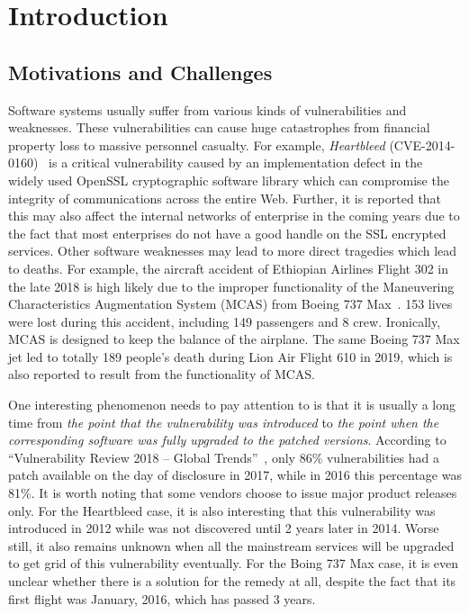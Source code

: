 
\chapter{Introduction} \label{ch:introduction}


\section{Motivations and Challenges}
Software systems usually suffer from various kinds of vulnerabilities and weaknesses. These vulnerabilities can cause huge catastrophes from financial property loss to massive personnel casualty. For example, \emph{Heartbleed} (CVE-2014-0160)~\cite{heartbleed} is a critical vulnerability caused by an implementation defect in the widely used OpenSSL cryptographic software library which can compromise the integrity of communications across the entire Web. Further, it is reported that this may also affect the internal networks of enterprise in the coming years due to the fact that most enterprises do not have a good handle on the SSL encrypted services. Other software weaknesses may lead to more direct tragedies which lead to deaths. For example, the aircraft accident of Ethiopian Airlines Flight 302 in the late 2018 is high likely due to the improper functionality of the Maneuvering Characteristics Augmentation System (MCAS) from Boeing 737 Max~\cite{boeing_Ethiopian}. 153 lives were lost during this accident, including 149 passengers and 8 crew. Ironically, MCAS is designed to keep the balance of the airplane. The same Boeing 737 Max jet led to totally 189 people's death during Lion Air Flight 610 in 2019, which is also reported to result from the functionality of MCAS.

One interesting phenomenon needs to pay attention to is that it is usually a long time from \emph{the point that the vulnerability was introduced} to \emph{the point when the corresponding software was fully upgraded to the patched versions}. According to ``Vulnerability Review 2018 -- Global Trends''~\cite{vul_flexera18}, only 86\% vulnerabilities had a patch available on the day of disclosure in 2017, while in 2016 this percentage was 81\%. It is worth noting that some vendors choose to issue major product releases only. For the Heartbleed case, it is also interesting that this vulnerability was introduced in 2012 while was not discovered until 2 years later in 2014. Worse still, it also remains unknown when all the mainstream services will be upgraded to get grid of this vulnerability eventually. For the Boing 737 Max case, it is even unclear whether there is a solution for the remedy at all, despite the fact that its first flight was January, 2016, which has passed 3 years.

